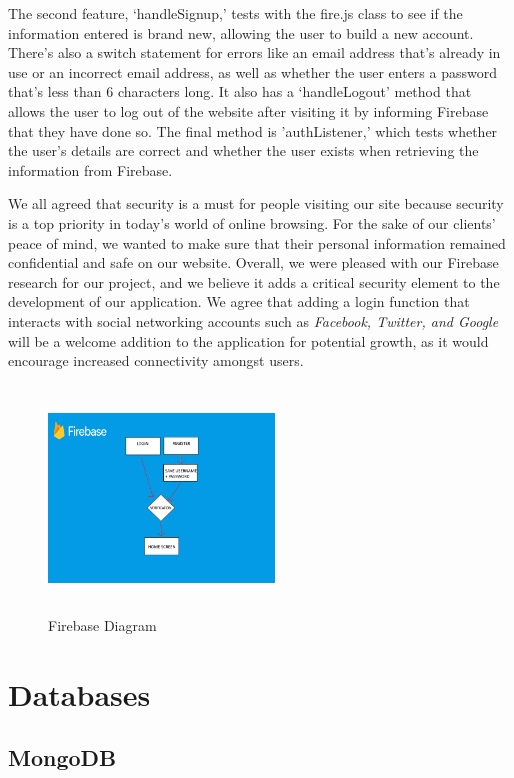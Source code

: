 The second feature, ‘handleSignup,' tests with the fire.js class to see if the information entered is brand new, allowing the user to build a new account. There's also a switch statement for errors like an email address that's already in use or an incorrect email address, as well as whether the user enters a password that's less than 6 characters long. It also has a ‘handleLogout' method that allows the user to log out of the website after visiting it by informing Firebase that they have done so. The final method is 'authListener,' which tests whether the user's details are correct and whether the user exists when retrieving the information from Firebase.\hfill \break

We all agreed that security is a must for people visiting our site because security is a top priority in today's world of online browsing. For the sake of our clients' peace of mind, we wanted to make sure that their personal information remained confidential and safe on our website. Overall, we were pleased with our Firebase research for our project, and we believe it adds a critical security element to the development of our application. We agree that adding a login function that interacts with social networking accounts such as \textit{Facebook, Twitter, and Google} will be a welcome addition to the application for potential growth, as it would encourage increased connectivity amongst users.


\begin{figure}
    \centering
    \includegraphics[width=6cm,height = 6cm]{images/45.png}
    \caption{ Firebase Diagram }
    \label{fig:my_label}
\end{figure}

\section{Databases}
\subsection{MongoDB}


